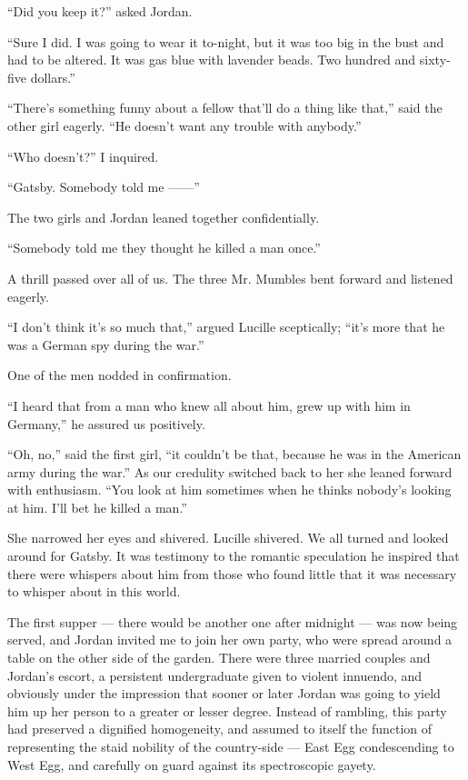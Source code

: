 \documentclass{znotebook}
\begin{document}
``Did you keep it?'' asked Jordan.

``Sure I did. I was going to wear it to-night, but it was too big in the bust and had to be altered. It was gas blue with lavender beads. Two hundred and sixty-five dollars.''

``There's something funny about a fellow that'll do a thing like that,'' said the other girl eagerly. ``He doesn't want any trouble with anybody.''

``Who doesn't?'' I inquired.

``Gatsby. Somebody told me ——''

The two girls and Jordan leaned together confidentially.

``Somebody told me they thought he killed a man once.''

A thrill passed over all of us. The three Mr. Mumbles bent forward and listened eagerly.

``I don't think it's so much that,'' argued Lucille sceptically; ``it's more that he was a German spy during the war.''

One of the men nodded in confirmation.

``I heard that from a man who knew all about him, grew up with him in Germany,'' he assured us positively.

``Oh, no,'' said the first girl, ``it couldn't be that, because he was in the American army during the war.'' As our credulity switched back to her she leaned forward with enthusiasm. ``You look at him sometimes when he thinks nobody's looking at him. I'll bet he killed a man.''

She narrowed her eyes and shivered. Lucille shivered. We all turned and looked around for Gatsby. It was testimony to the romantic speculation he inspired that there were whispers about him from those who found little that it was necessary to whisper about in this world.

The first supper — there would be another one after midnight — was now being served, and Jordan invited me to join her own party, who were spread around a table on the other side of the garden. There were three married couples and Jordan's escort, a persistent undergraduate given to violent innuendo, and obviously under the impression that sooner or later Jordan was going to yield him up her person to a greater or lesser degree. Instead of rambling, this party had preserved a dignified homogeneity, and assumed to itself the function of representing the staid nobility of the country-side — East Egg condescending to West Egg, and carefully on guard against its spectroscopic gayety.
\end{document}
